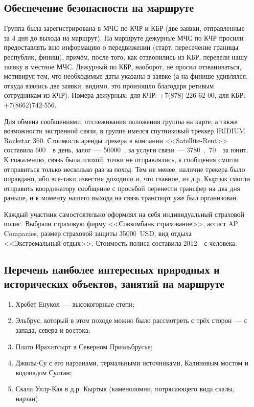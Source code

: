 \subsection{Обеспечение безопасности на маршруте}
Группа была зарегистрирована в МЧС по КЧР и КБР (две заявки, отправленные за 4 дня до выхода на маршрут). На маршруте дежурные МЧС по КЧР просили предоставлять всю информацию о передвижении (старт, пересечение границы республик, финиш), причём, после того, как отзвонились из КБР, перевели нашу заявку в местное МЧС. Дежурный по КБР, наоборот, не просил отзваниваться, мотивируя тем, что необходимые даты указаны в заявке (а на финише удивлялся, откуда взялись две заявки; видимо, это произошло благодаря ретивым сотрудникам из КЧР). Номера дежурных: для КЧР: +7(878) 226-62-00, для КБР: +7(8662)742-556.

Для обмена сообщениями, отслеживания положения группы на карте, а также возможности экстренной связи, в группе имелся спутниковый треккер IRIDIUM Rockstar 360. Стоимость аренды трекера в компании <<Satellite-Rent>> составила 600~\faRub~в день, залог~--- 50000~\faRub, за услуги связи~--- 3780~\faRuble,~70~\faRub~за юнит. К сожалению, связь была плохой, точки не отправлялись, а сообщения смогли отправиться только несколько раз за поход. Тем не менее, наличие трекера было оправдано, ибо все-таки известия доходили и, что главное, из д.р. Кыртык смогли отправить координатору сообщение с просьбой перенести трансфер на два дня раньше, и к моменту нашего выхода на связь транспорт уже был организован.

Каждый участник самостоятельно оформлял на себя индивидуальный страховой полис. Выбрали страховую фирму <<Совкомбанк страхование>>, ассист AP Companies, размер страховой защиты 35000~USD,  вид отдыха <<Экстремальный отдых>>. Стоимость полиса составила 2012~\faRuble~с человека.

\subsection{Перечень наиболее интересных природных и исторических объектов, занятий на маршруте}
\begin{enumerate}[noitemsep,topsep=0pt,parsep=0pt,partopsep=0pt]
	\item Хребет Енукол~--- высокогорные степи;
	\item Эльбрус, который в этом походе можно было рассмотреть с трёх сторон~--- с запада, севера и востока;
	\item Плато Ирахитсырт в Северном Приэльбрусье;
	\item Джилы-Су с его нарзанами, термальными источниками, Калиновым мостом и водопадом Султан;
	\item Скала Уллу-Кая в д.р. Кыртык (каменоломни, потрясающего вида скалы, нарзан).
\end{enumerate}

